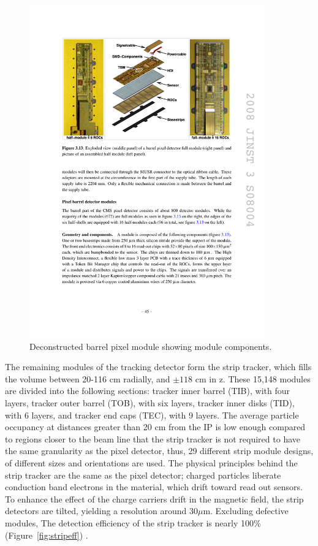 \begin{figure}[tbh]
\centering
\includegraphics[width=4in]{figures/pixelmodule.pdf}
\caption{Deconstructed barrel pixel module showing module components.}
\label{fig:pixmodule}
\end{figure}

\indent The remaining modules of the tracking detector form the strip tracker, which fills the volume between 20-116 cm radially, and $\pm118$ cm in z. These 15,148 modules are divided into the following sections: tracker inner barrel (TIB), with four layers, tracker outer barrel (TOB), with six layers, tracker inner disks (TID), with 6 layers, and tracker end caps (TEC), with 9 layers. The average particle occupancy at distances greater than 20 cm from the IP is low enough compared to regions closer to the beam line that the strip tracker is not required to have the same granularity as the pixel detector, thus, 29 different strip module designs, of different sizes and orientations are used. The physical principles behind the strip tracker are the same as the pixel detector; charged particles liberate conduction band electrons in the material, which drift toward read out sensors. To enhance the effect of the charge carriers drift in the magnetic field, the strip detectors are tilted, yielding a resolution around 30$\mu$m. Excluding defective modules, The detection efficiency of the strip tracker is nearly 100\% (Figure~\ref{fig:stripeff}) \cite{Chatrchyan:2014fea}.

